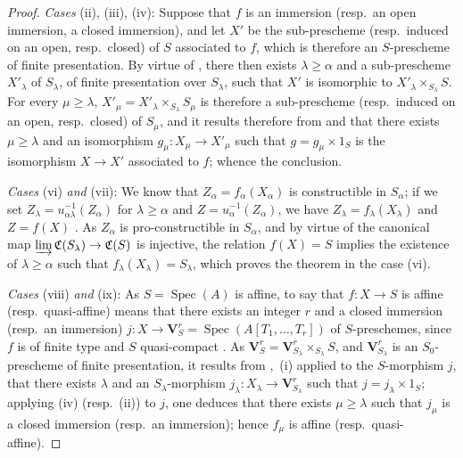 \begin{proof}
\emph{Cases} (ii), (iii), (iv): Suppose that $f$ is an immersion (resp.\ an open immersion, a closed immersion), and let $X'$ be the sub-prescheme (resp.\ induced on an open, resp.\ closed) of $S$ associated to $f$, which is therefore an $S$-prescheme of finite presentation.
By virtue of , there then exists $\lambda\geqslant\alpha$ and a sub-prescheme $X'_\lambda$ of $S_\lambda$, of finite presentation over $S_\lambda$, such that $X'$ is isomorphic to $X'_\lambda\times_{S_\lambda}S$.
For every $\mu\geqslant\lambda$, $X'_\mu=X'_\lambda\times_{S_\lambda}S_\mu$ is therefore a sub-prescheme (resp.\ induced on an open, resp.\ closed) of $S_\mu$, and it results therefore from  and  that there exists $\mu\geqslant\lambda$ and an isomorphism $g_\mu:X_\mu\to X'_\mu$ such that $g=g_\mu\times 1_S$ is the isomorphism $X\to X'$ associated to $f$; whence the conclusion.

\emph{Cases} (vi) \emph{and} (vii): We know  that $Z_\alpha=f_\alpha(X_\alpha)$ is constructible in $S_\alpha$; if we set $Z_\lambda=u_{\alpha\lambda}^{-1}(Z_\alpha)$ for $\lambda\geqslant\alpha$ and $Z=u_\alpha^{-1}(Z_\alpha)$, we have $Z_\lambda=f_\lambda(X_\lambda)$ and $Z=f(X)$ .
As $Z_\alpha$ is pro-constructible in $S_\alpha$, and by virtue of  the canonical map $\varinjlim\mathfrak{C}(S_\lambda)\to\mathfrak{C}(S)$ is injective, the relation $f(X)=S$ implies the existence of $\lambda\geqslant\alpha$ such that $f_\lambda(X_\lambda)=S_\lambda$, which proves the theorem in the case (vi).

\emph{Cases} (viii) \emph{and} (ix): As $S=\operatorname{Spec}(A)$ is affine, to say that $f:X\to S$ is affine (resp.\ quasi-affine) means that there exists an integer $r$ and a closed immersion (resp.\ an immersion) $j:X\to\mathbf{V}^r_S=\operatorname{Spec}(A[T_1,\ldots,T_r])$ of $S$-preschemes, since $f$ is of finite type and $S$ quasi-compact .
As $\mathbf{V}^r_S=\mathbf{V}^r_{S_\lambda}\times_{S_\lambda}S$, and $\mathbf{V}^r_{S_\lambda}$ is an $S_0$-prescheme of finite presentation, it results from ,~(i) applied to the $S$-morphism $j$, that there exists $\lambda$ and an $S_\lambda$-morphism $j_\lambda:X_\lambda\to\mathbf{V}^r_{S_\lambda}$ such that $j=j_\lambda\times 1_S$; applying (iv) (resp.\ (ii)) to $j$, one deduces that there exists $\mu\geqslant\lambda$ such that $j_\mu$ is a closed immersion (resp.\ an immersion); hence $f_\mu$ is affine (resp.\ quasi-affine).


\end{proof}
